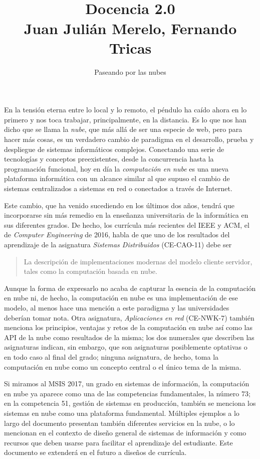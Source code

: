 \documentclass[twoside,10pt]{article}
\title{\ \\ Docencia 2.0\\ \large  Juan Julián Merelo, Fernando 
Tricas}
\author{\LARGE Paseando por las nubes}
\date{}
\newcounter{num}
\begin{document}
\maketitle
\vspace*{-5ex}

\addtocounter{page}{2}
\begin{multicols}{2}

En la tensi\'on eterna entre lo local y lo remoto, el p\'endulo ha
ca\'ido ahora en lo primero y nos toca trabajar, principalmente, en la
distancia.  Es lo que nos han dicho que se llama la {\em nube}, que
m\'as all\'a de ser una especie de web, pero para hacer m\'as cosas,
es un verdadero cambio de paradigma en el desarrollo, prueba y
despliegue de sistemas inform\'aticos complejos.  Conectando una serie
de tecnolog\'ias y conceptos preexistentes, desde la concurrencia
hasta la programaci\'on funcional, hoy en d\'ia la {\em computaci\'on
en nube} es una nueva plataforma inform\'atica con un alcance similar
al que supuso el cambio de sistemas centralizados a sistemas en red o
conectados a trav\'es de Internet.

Este cambio, que ha venido sucediendo en los \'ultimos dos a\~nos, tendr\'a
que incorporarse sin m\'as remedio en la ense\~nanza universitaria de la
inform\'atica en sus diferentes grados. De hecho, los curr\'icula m\'as
recientes del IEEE y ACM, el de {\em Computer Engineering} de 2016, habla de
que uno de los resultados del aprendizaje de la asignatura {\em Sistemas
Distribuidos} (CE-CAO-11) debe ser    
\begin{quote}
  La descripci\'on de implementaciones modernas del modelo cliente
  servidor, tales como la computaci\'on basada en nube.
\end{quote}
Aunque la forma de expresarlo no acaba de capturar la esencia de la
computaci\'on en nube ni, de hecho, la computaci\'on en nube es una
implementaci\'on de ese modelo, al menos hace una menci\'on a este
paradigma y las universidades deber\'ian tomar nota. Otra asignatura,
{\em Aplicaciones en red} (CE-NWK-7) tambi\'en menciona los principios,
ventajas y retos de la computaci\'on en nube as\'i como las API de la
nube como resultados de la misma; los dos numerales que describen las
asignaturas indican, sin embargo, que son asignaturas posiblemente
optativas o en todo caso al final del grado; ninguna asignatura, de
hecho, toma la computaci\'on en nube como un concepto central o el \'unico
tema de la misma. 

Si miramos al MSIS 2017, un grado en sistemas de informaci\'on, la
computaci\'on en nube ya aparece como una de las competencias
fundamentales, la n\'umero 73; en la competencia 51, gesti\'on de
sistemas en producci\'on, tambi\'en se menciona los sistemas en nube como
una plataforma fundamental. M\'ultiples ejemplos a lo largo del
documento presentan tambi\'en diferentes servicios en la nube, o lo
mencionan en el contexto de dise\~no general de sistemas de
informaci\'on y como recursos que deben usarse para facilitar el
aprendizaje del estudiante. Este documento se extender\'a en el futuro a
dise\~nos de curr\'icula. 


\end{multicols}
\end{document}
